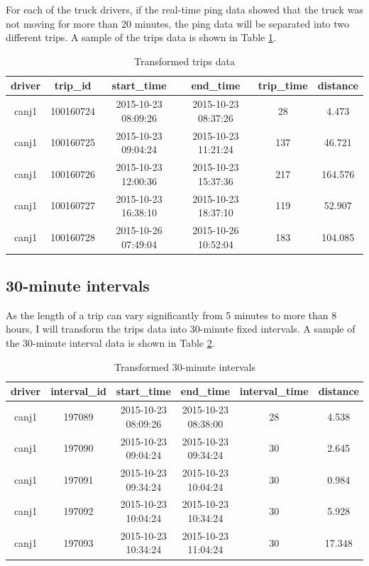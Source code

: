 \documentclass[12pt]{book}
\numberwithin{equation}{chapter}
\begin{document}
For each of the truck drivers, if the real-time ping data showed that the truck was not moving for more than 20 minutes, the ping data will be separated into two different trips. A sample of the trips data is shown in Table \ref{tab:transformtrip}.

\begin{table}[H]

\caption{\label{tab:transformtrip}Transformed trips data}
\centering
\begin{tabular}{cccccc}
\toprule
driver & trip\_id & start\_time & end\_time & trip\_time & distance\\
\midrule
canj1 & 100160724 & 2015-10-23 08:09:26 & 2015-10-23 08:37:26 & 28 & 4.473\\
canj1 & 100160725 & 2015-10-23 09:04:24 & 2015-10-23 11:21:24 & 137 & 46.721\\
canj1 & 100160726 & 2015-10-23 12:00:36 & 2015-10-23 15:37:36 & 217 & 164.576\\
canj1 & 100160727 & 2015-10-23 16:38:10 & 2015-10-23 18:37:10 & 119 & 52.907\\
canj1 & 100160728 & 2015-10-26 07:49:04 & 2015-10-26 10:52:04 & 183 & 104.085\\
\bottomrule
\end{tabular}
\end{table}

\hypertarget{minute-intervals}{%
\subsection{30-minute intervals}\label{minute-intervals}}

As the length of a trip can vary significantly from 5 minutes to more than 8 hours, I will transform the trips data into 30-minute fixed intervals. A sample of the 30-minute interval data is shown in Table \ref{tab:tranform30interval}.

\begin{table}[H]

\caption{\label{tab:tranform30interval}Transformed 30-minute intervals}
\centering
\begin{tabular}{cccccc}
\toprule
driver & interval\_id & start\_time & end\_time & interval\_time & distance\\
\midrule
canj1 & 197089 & 2015-10-23 08:09:26 & 2015-10-23 08:38:00 & 28 & 4.538\\
canj1 & 197090 & 2015-10-23 09:04:24 & 2015-10-23 09:34:24 & 30 & 2.645\\
canj1 & 197091 & 2015-10-23 09:34:24 & 2015-10-23 10:04:24 & 30 & 0.984\\
canj1 & 197092 & 2015-10-23 10:04:24 & 2015-10-23 10:34:24 & 30 & 5.928\\
canj1 & 197093 & 2015-10-23 10:34:24 & 2015-10-23 11:04:24 & 30 & 17.348\\
\bottomrule
\end{tabular}
\end{table}
\end{document}
